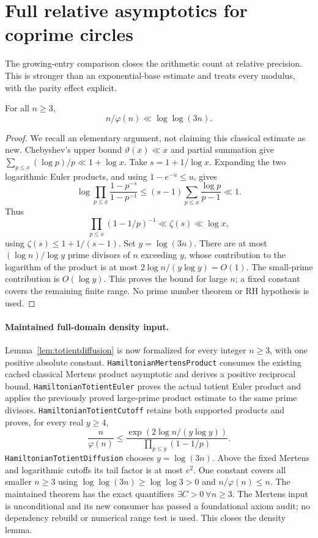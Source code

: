 \section{Full relative asymptotics for coprime circles}
\label{sec:relativecoprime}
The growing-entry comparison closes the arithmetic count at
relative precision. This is stronger than an exponential-base
estimate and treats every modulus, with the parity effect explicit.

\begin{lemma}
\label{lem:totientdiffusion}
For all \(n\geq3\),
\[
 n/\varphi(n)\ll\log\log(3n).
\]
\end{lemma}
\begin{proof}
We recall an elementary argument, not claiming this classical
estimate as new.
Chebyshev's upper bound \(\vartheta(x)\ll x\) and partial
summation give
\(\sum_{p\leq x}(\log p)/p\ll1+\log x\).
Take \(s=1+1/\log x\).
Expanding the two logarithmic Euler products, and using
\(1-e^{-u}\leq u\), gives
\[
 \log\prod_{p\leq x}
       \frac{1-p^{-s}}{1-p^{-1}}
 \leq(s-1)\sum_{p\leq x}\frac{\log p}{p-1}\ll1 .
\]
Thus
\[
 \prod_{p\leq x}(1-1/p)^{-1}
                  \ll\zeta(s)\ll\log x,
\]
using \(\zeta(s)\leq1+1/(s-1)\).
Set \(y=\log(3n)\).
There are at most \((\log n)/\log y\) prime divisors of
\(n\) exceeding \(y\), whose contribution to the logarithm
of the product is at most
\(2\log n/(y\log y)=O(1)\).
The small-prime contribution is \(O(\log y)\).
This proves the bound for large \(n\); a fixed constant
covers the remaining finite range.
No prime number theorem or RH hypothesis is used.
\end{proof}

\paragraph{Maintained full-domain density input.}
Lemma~\ref{lem:totientdiffusion} is now formalized for every
integer \(n\geq3\), with one positive absolute constant.
\texttt{HamiltonianMertensProduct} consumes the existing
cached classical Mertens product asymptotic and derives a
positive reciprocal bound.
\texttt{HamiltonianTotientEuler} proves the actual totient
Euler product and applies the previously proved large-prime
product estimate to the same prime divisors.
\texttt{HamiltonianTotientCutoff} retains both supported
products and proves, for every real \(y\geq4\),
\[
 \frac n{\varphi(n)}
 \leq
 \frac{\exp(2\log n/(y\log y))}
      {\prod_{p\leq y}(1-1/p)}.
\]
\texttt{HamiltonianTotientDiffusion} chooses
\(y=\log(3n)\). Above the fixed Mertens and logarithmic
cutoffs its tail factor is at most \(e^2\).
One constant covers all smaller \(n\geq3\) using
\(\log\log(3n)\geq\log\log3>0\) and \(n/\varphi(n)\leq n\).
The maintained theorem has the exact quantifiers
\(\exists C>0\ \forall n\geq3\).
The Mertens input is unconditional and its new consumer has
passed a foundational axiom audit; no dependency rebuild or
numerical range test is used.
This closes the density lemma.

